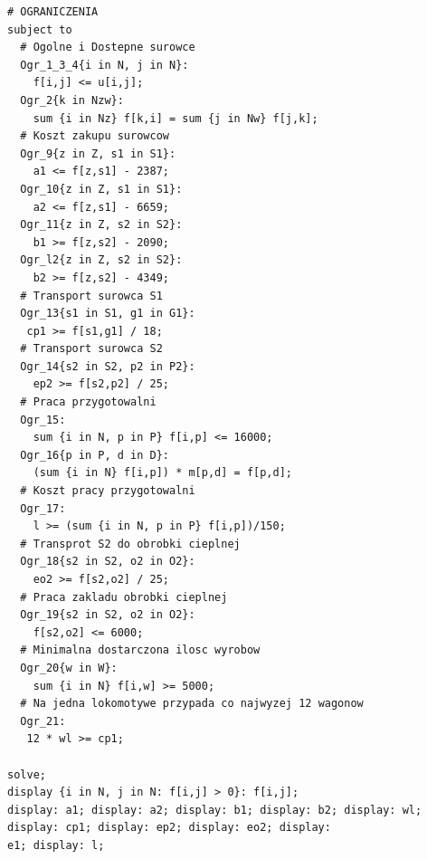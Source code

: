 \begin{lstlisting}[caption= plik mod]
# OGRANICZENIA
subject to
  # Ogolne i Dostepne surowce
  Ogr_1_3_4{i in N, j in N}:
    f[i,j] <= u[i,j];
  Ogr_2{k in Nzw}:
    sum {i in Nz} f[k,i] = sum {j in Nw} f[j,k];    
  # Koszt zakupu surowcow
  Ogr_9{z in Z, s1 in S1}:
    a1 <= f[z,s1] - 2387;
  Ogr_10{z in Z, s1 in S1}:
    a2 <= f[z,s1] - 6659;
  Ogr_11{z in Z, s2 in S2}:
    b1 >= f[z,s2] - 2090;
  Ogr_l2{z in Z, s2 in S2}:
    b2 >= f[z,s2] - 4349;
  # Transport surowca S1
  Ogr_13{s1 in S1, g1 in G1}:
   cp1 >= f[s1,g1] / 18;
  # Transport surowca S2
  Ogr_14{s2 in S2, p2 in P2}:
    ep2 >= f[s2,p2] / 25;
  # Praca przygotowalni
  Ogr_15: 
    sum {i in N, p in P} f[i,p] <= 16000;
  Ogr_16{p in P, d in D}:
    (sum {i in N} f[i,p]) * m[p,d] = f[p,d];
  # Koszt pracy przygotowalni
  Ogr_17: 
    l >= (sum {i in N, p in P} f[i,p])/150;
  # Transprot S2 do obrobki cieplnej
  Ogr_18{s2 in S2, o2 in O2}:
    eo2 >= f[s2,o2] / 25;
  # Praca zakladu obrobki cieplnej
  Ogr_19{s2 in S2, o2 in O2}:
    f[s2,o2] <= 6000;
  # Minimalna dostarczona ilosc wyrobow
  Ogr_20{w in W}:
   	sum {i in N} f[i,w] >= 5000;
  # Na jedna lokomotywe przypada co najwyzej 12 wagonow
  Ogr_21:
   12 * wl >= cp1;
  
solve;
display {i in N, j in N: f[i,j] > 0}: f[i,j];
display: a1; display: a2; display: b1; display: b2; display: wl;
display: cp1; display: ep2; display: eo2; display: 
e1; display: l;
\end{lstlisting}

